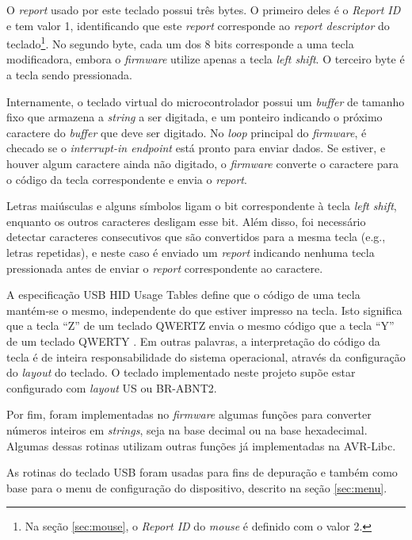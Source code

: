 \documentclass[brazil,pagestart=firstchapter]{abnt}
\makeatletter
\newcommand*{\eg}{e.g.\@\xspace}
\makeatother
\begin{document}
O \textit{report} usado por este teclado possui três bytes. O primeiro deles
é o \textit{Report ID} e tem valor 1, identificando que este \textit{report}
corresponde ao \textit{report descriptor} do teclado\footnote{
	Na seção \ref{sec:mouse}, o \textit{Report ID} do \textit{mouse} é
	definido com o valor 2.
}. No segundo byte, cada um dos 8 bits corresponde a uma tecla modificadora,
embora o \textit{firmware} utilize apenas a tecla \textit{left shift}. O
terceiro byte é a tecla sendo pressionada.

Internamente, o teclado virtual do microcontrolador possui um
\textit{buffer} de tamanho fixo que armazena a \textit{string} a ser
digitada, e um ponteiro indicando o próximo caractere do \textit{buffer} que
deve ser digitado. No \textit{loop} principal do \textit{firmware}, é
checado se o \textit{interrupt-in endpoint} está pronto para enviar dados.
Se estiver, e houver algum caractere ainda não digitado, o \textit{firmware}
converte o caractere para o código da tecla correspondente e envia o
\textit{report}.

Letras maiúsculas e alguns símbolos ligam o bit correspondente à tecla
\textit{left shift}, enquanto os outros caracteres desligam esse bit. Além
disso, foi necessário detectar caracteres consecutivos que são convertidos
para a mesma tecla (\eg, letras repetidas), e neste caso é enviado um
\textit{report} indicando nenhuma tecla pressionada antes de enviar o
\textit{report} correspondente ao caractere.

A especificação \ac{USB} \ac{HID} Usage Tables define que o código de uma
tecla mantém-se o mesmo, independente do que estiver impresso na tecla. Isto
significa que a tecla ``Z'' de um teclado QWERTZ envia o mesmo código que a
tecla ``Y'' de um teclado QWERTY \cite{usbhut}. Em outras palavras, a
interpretação do código da tecla é de inteira responsabilidade do sistema
operacional, através da configuração do \textit{layout} do teclado. O
teclado implementado neste projeto supõe estar configurado com
\textit{layout} US ou BR-ABNT2.

Por fim, foram implementadas no \textit{firmware} algumas funções para
converter números inteiros em \textit{strings}, seja na base decimal ou na
base hexadecimal. Algumas dessas rotinas utilizam outras funções já
implementadas na AVR-Libc.

As rotinas do teclado \ac{USB} foram usadas para fins de depuração e também
como base para o menu de configuração do dispositivo, descrito na seção
\ref{sec:menu}.
\end{document}
